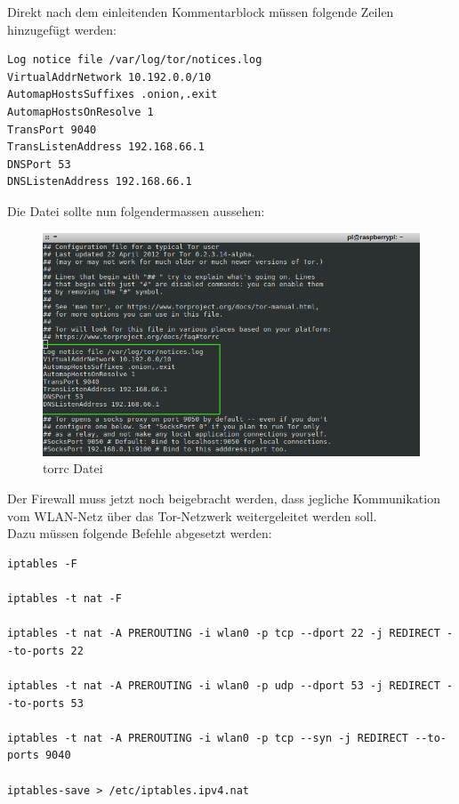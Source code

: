 
Direkt nach dem einleitenden Kommentarblock müssen folgende Zeilen hinzugefügt werden:

\begin{lstlisting}
Log notice file /var/log/tor/notices.log
VirtualAddrNetwork 10.192.0.0/10
AutomapHostsSuffixes .onion,.exit
AutomapHostsOnResolve 1
TransPort 9040
TransListenAddress 192.168.66.1
DNSPort 53
DNSListenAddress 192.168.66.1
\end{lstlisting}

Die Datei sollte nun folgendermassen aussehen: 

\begin{figure}[h]
\centering
\includegraphics[scale=0.6]{images/torrc}
\caption{torrc Datei}
\end{figure}

Der Firewall muss jetzt noch beigebracht werden, dass jegliche Kommunikation vom WLAN-Netz über das Tor-Netzwerk weitergeleitet werden soll. \\
Dazu müssen folgende Befehle abgesetzt werden:


\begin{lstlisting}
iptables -F

iptables -t nat -F

iptables -t nat -A PREROUTING -i wlan0 -p tcp --dport 22 -j REDIRECT --to-ports 22

iptables -t nat -A PREROUTING -i wlan0 -p udp --dport 53 -j REDIRECT --to-ports 53

iptables -t nat -A PREROUTING -i wlan0 -p tcp --syn -j REDIRECT --to-ports 9040

iptables-save > /etc/iptables.ipv4.nat
\end{lstlisting}

